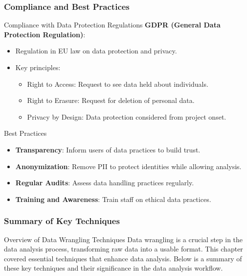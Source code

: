 \documentclass[aspectratio=169]{beamer}
\begin{document}
\begin{frame}[fragile]
    \frametitle{Compliance and Best Practices}
    \begin{block}{Compliance with Data Protection Regulations}
        \textbf{GDPR (General Data Protection Regulation)}:
        \begin{itemize}
            \item Regulation in EU law on data protection and privacy.
            \item Key principles:
                \begin{itemize}
                    \item Right to Access: Request to see data held about individuals.
                    \item Right to Erasure: Request for deletion of personal data.
                    \item Privacy by Design: Data protection considered from project onset.
                \end{itemize}
        \end{itemize}
    \end{block}
    \begin{block}{Best Practices}
        \begin{itemize}
            \item \textbf{Transparency}: Inform users of data practices to build trust.
            \item \textbf{Anonymization}: Remove PII to protect identities while allowing analysis.
            \item \textbf{Regular Audits}: Assess data handling practices regularly.
            \item \textbf{Training and Awareness}: Train staff on ethical data practices.
        \end{itemize}
    \end{block}
\end{frame}

\begin{frame}[fragile]
    \frametitle{Summary of Key Techniques}
    \begin{block}{Overview of Data Wrangling Techniques}
        Data wrangling is a crucial step in the data analysis process, transforming raw data into a usable format. This chapter covered essential techniques that enhance data analysis. Below is a summary of these key techniques and their significance in the data analysis workflow.
    \end{block}
\end{frame}
\end{document}
